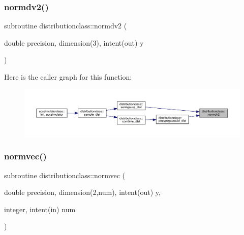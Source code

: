 \mbox{\label{namespacedistributionclass_a020961b4717af242fc3c82090a17ce12}} 
\subsubsection{\texorpdfstring{normdv2()}{normdv2()}}
{\footnotesize\ttfamily subroutine distributionclass\+::normdv2 (\begin{DoxyParamCaption}\item[{double precision, dimension(3), intent(out)}]{y }\end{DoxyParamCaption})}

Here is the caller graph for this function\+:\nopagebreak
\begin{figure}[H]
\begin{center}
\leavevmode
\includegraphics[width=350pt]{namespacedistributionclass_a020961b4717af242fc3c82090a17ce12_icgraph}
\end{center}
\end{figure}
\mbox{\label{namespacedistributionclass_acfc04ca0c8be3e0f3e73779c5e88693b}} 
\subsubsection{\texorpdfstring{normvec()}{normvec()}}
{\footnotesize\ttfamily subroutine distributionclass\+::normvec (\begin{DoxyParamCaption}\item[{double precision, dimension(2,num), intent(out)}]{y,  }\item[{integer, intent(in)}]{num }\end{DoxyParamCaption})}

